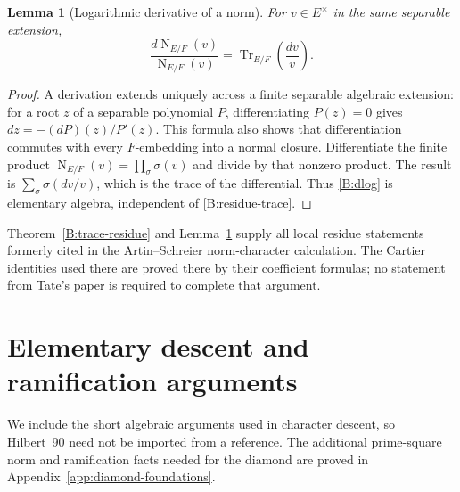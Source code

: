 \documentclass[11pt]{amsart}
\newtheorem{lemma}[theorem]{Lemma}
\theoremstyle{definition}
\theoremstyle{remark}
\newcommand{\Tr}{\operatorname{Tr}}
\newcommand{\Nm}{\operatorname{N}}
\begin{document}
\begin{lemma}[Logarithmic derivative of a norm]\label{B:dlog-norm}
For $v\in E^\times$ in the same separable extension,
\begin{equation}\label{B:dlog}
 \frac{d\Nm_{E/F}(v)}{\Nm_{E/F}(v)}
                      =\Tr_{E/F}\left(\frac{dv}{v}\right).
\end{equation}
\end{lemma}
\begin{proof}
A derivation extends uniquely across a finite separable algebraic
extension: for a root $z$ of a separable polynomial $P$, differentiating
$P(z)=0$ gives $dz=- (dP)(z)/P'(z)$. This formula also shows that
differentiation commutes with every $F$-embedding into a normal closure.
Differentiate the finite product
$\Nm_{E/F}(v)=\prod_\sigma\sigma(v)$ and divide by that nonzero
product. The result is
$\sum_\sigma\sigma(dv/v)$, which is the trace of the differential.
Thus \eqref{B:dlog} is elementary algebra, independent of
\eqref{B:residue-trace}.
\end{proof}

Theorem~\ref{B:trace-residue} and Lemma~\ref{B:dlog-norm} supply all
local residue statements formerly cited in the Artin--Schreier
norm-character calculation. The Cartier identities used there are
proved there by their coefficient formulas; no statement from Tate's
paper is required to complete that argument.


\section{Elementary descent and ramification arguments}\label{app:descent}
We include the short algebraic arguments used in character descent, so
Hilbert~90 need not be imported from a reference. The additional
prime-square norm and ramification facts needed for the diamond are
proved in Appendix~\ref{app:diamond-foundations}.
\end{document}
